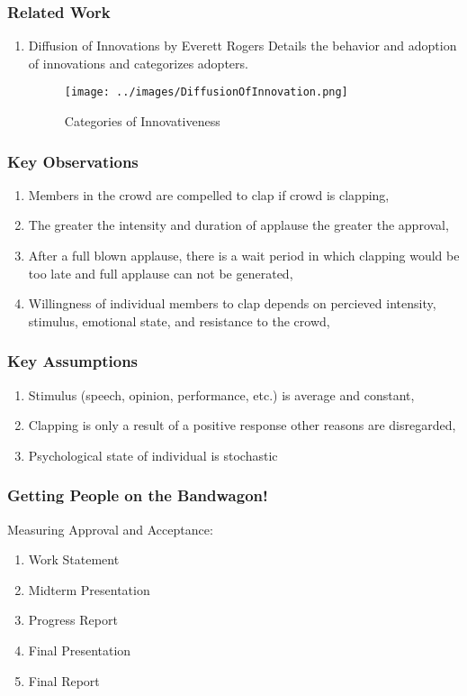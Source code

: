 \documentclass[compress,handout,10pt]{beamer}
\let\olditem\item
\renewcommand{\item}{\setlength{\itemsep}{0.5\baselineskip}\olditem}
\begin{document}
\begin{frame}
  \frametitle{Related Work}
	\begin{enumerate}
		\item Diffusion of Innovations by Everett Rogers \newline\newline
		Details the behavior and adoption of innovations and categorizes adopters.
\begin{figure}[h]
    \begin{center}
        \texttt{[image: ../images/DiffusionOfInnovation.png]}
    \end{center}
    \caption{Categories of Innovativeness}
    \label{diffusion}
\end{figure}
	\end{enumerate}
\end{frame} 

\begin{frame}
  \frametitle{Key Observations}
	\begin{enumerate}
		\item Members in the crowd are compelled to clap if crowd is clapping,
		\item The greater the intensity and duration of applause the greater the approval,
		\item After a full blown applause, there is a wait period in which clapping would be too late and full applause can not be generated,
		\item Willingness of individual members to clap depends on percieved intensity, stimulus, emotional state, and resistance to the crowd, 
	\end{enumerate}

\end{frame}

\begin{frame}
   \frametitle{Key Assumptions}
	\begin {enumerate}
		\item Stimulus (speech, opinion, performance, etc.)  is average and constant,
		\item Clapping is only a result of a positive response other reasons are disregarded,
		\item Psychological state of individual is stochastic
	\end{enumerate}	
\end{frame}


\begin{frame}
    \frametitle{Getting People on the Bandwagon!}
    Measuring Approval and Acceptance:
    \vspace{7pt}
             \begin{enumerate}
                 \item Work Statement
                 \item Midterm Presentation
                 \item Progress Report
                 \item Final Presentation
                 \item Final Report
             \end{enumerate}
\end{frame}
\end{document}
